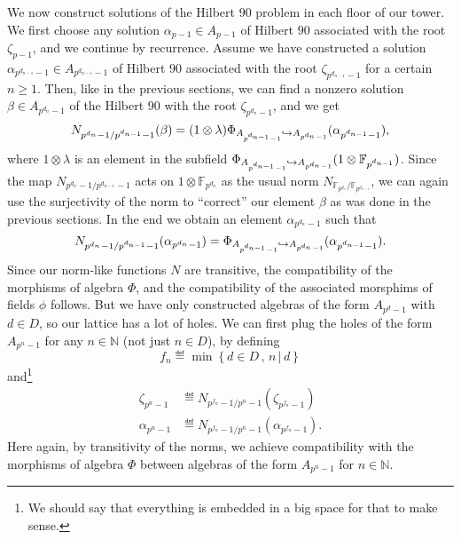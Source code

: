\documentclass[a4paper,11pt]{article}
\begin{document}
We now construct solutions of the Hilbert $90$ problem in each floor of our
tower. We first choose any solution $\alpha_{p-1}\in A_{p-1}$ of Hilbert $90$
associated with the root $\zeta_{p-1}$, and we continue by recurrence. Assume we
have constructed a solution $\alpha_{p^{d_{n-1}}-1}\in A_{p^{d_{n-1}}-1}$ of
Hilbert $90$ associated with the root $\zeta_{p^{d_{n-1}}-1}$ for a certain
$n\geq1$. Then, like in the previous sections, we can find a nonzero solution
$\beta\in A_{p^{d_n}-1}$ of the Hilbert $90$ with the root $\zeta_{p^{d_n}-1}$,
and we get
\[
  N_{p^{d_n}-1/p^{d_{n-1}}-1}(\beta)=(1\otimes\lambda)\Phi_{A_{p^{d_{n-1}}-1}\hookrightarrow
  A_{p^{d_n}-1}}(\alpha_{p^{d_{n-1}}-1}),
\]
where $1\otimes\lambda$ is an element in the subfield $\Phi_{A_{p^{d_{n-1}}-1}\hookrightarrow
A_{p^{d_n}-1}}(1\otimes\mathbb{F}_{p^{d_{n-1}}})$. Since the map
$N_{p^{d_n}-1/p^{d_{n-1}}-1}$ acts on $1\otimes\mathbb{F}_{p^{d_n}}$ as the
usual norm $N_{\mathbb{F}_{p^{d_n}}/\mathbb{F}_{p^{d_{n-1}}}}$, we can again use
the surjectivity of the norm to ``correct'' our element $\beta$ as was done in
the previous sections. In the end we obtain an element $\alpha_{p^{d_n}-1}$ such
that
\[
  N_{p^{d_n}-1/p^{d_{n-1}}-1}(\alpha_{p^{d_n}-1})=\Phi_{A_{p^{d_{n-1}}-1}\hookrightarrow
  A_{p^{d_n}-1}}(\alpha_{p^{d_{n-1}}-1}).
\]
Since our norm-like functions $N$ are transitive, the compatibility of the
morphisms of algebra $\Phi$, and the compatibility of the associated morsphims
of fields $\phi$ follows. But we have only constructed algebras of the form
$A_{p^d-1}$ with $d\in D$, so our lattice has a lot of holes. We can first plug
the holes of the form $A_{p^{n}-1}$ for any $n\in\mathbb{N}$ (not just $n\in
D$), by defining 
\[
  f_n \eqdef \min\left\{ d\in D\,,\,n\,|\,d \right\}
\]
and\footnote{We should say that
  everything is embedded in a big space for that to make sense.}
\begin{align*}
  \zeta_{p^n-1}&\eqdef  N_{p^{f_n}-1/p^n-1}(\zeta_{p^{f_n}-1})\\
  \alpha_{p^n-1}&\eqdef
  N_{p^{f_n}-1/p^n-1}(\alpha_{p^{f_n}-1}).
\end{align*}
Here again, by transitivity of the norms, we achieve compatibility with the
morphisms of algebra $\Phi$ between algebras of the form $A_{p^n-1}$ for $n\in\mathbb{N}$.
\end{document}
